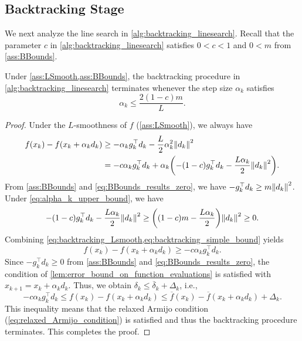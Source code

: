 \documentclass[journal_revised_MPC]{subfiles}
\begin{document}
\subsection{Backtracking Stage}\label{sec:inner_loop}

We next analyze the line search in \cref{alg:backtracking_linesearch}.
Recall that the parameter $c$ in \cref{alg:backtracking_linesearch} satisfies $0 < c < 1$ and $0 < m$ from \cref{ass:BBounds}.

\begin{lemma}\label{lem:backtracking_finite}
    Under \cref{ass:LSmooth,ass:BBounds},
    the backtracking procedure in \cref{alg:backtracking_linesearch} terminates whenever the step size $\alpha_k$ satisfies
    \begin{equation}\label{eq:alpha_k_upper_bound}
        \alpha_k \le \frac{2(1-c)m}{L}.
    \end{equation}
\end{lemma}
\begin{proof}
    Under the $L$-smoothness of $f$ (\cref{ass:LSmooth}), we always have
    \begin{align}
        f(x_k)-f(x_k+\alpha_k d_k)
         & \ge -\alpha_k g_k^\top d_k - \frac{L}{2}\alpha_k^2\norm{d_k}^2                                   \notag                           \\
         & = -c \alpha_k g_k^\top d_k + \alpha_k \qty(-(1-c)g_k^\top d_k - \frac{L\alpha_k}{2}\norm{d_k}^2). \label{eq:backtracking_Lsmooth}
    \end{align}
    From \cref{ass:BBounds} and \cref{eq:BBounds_results_zero}, we have $-g_k^\top d_k \geq m \norm{d_k}^2$.
    Under \cref{eq:alpha_k_upper_bound}, we have
    \begin{equation}\label{eq:backtracking_simple_bound}
        -(1-c)g_k^\top d_k - \frac{L\alpha_k}{2}\norm{d_k}^2
        \ge \qty((1-c)m - \frac{L\alpha_k}{2})\norm{d_k}^2 \ge 0.
    \end{equation}
    Combining \cref{eq:backtracking_Lsmooth,eq:backtracking_simple_bound} yields
    \begin{equation*}
        f(x_k) - f(x_k+\alpha_k d_k) \geq -c \alpha_k g_k^\top d_k.
    \end{equation*}
    Since $-g_k^\top d_k \geq 0$ from \cref{ass:BBounds} and \cref{eq:BBounds_results_zero}, the condition of \cref{lem:error_bound_on_function_evaluations} is satisfied with $x_{k+1} = x_k + \alpha_k d_k$.
    Thus, we obtain $\delta_k \le \overline{\delta}_k + \Delta_k$, i.e.,
    \begin{equation*}
        -c\alpha_k g_k^\top d_k
        \le
        f(x_k) - f(x_k+\alpha_k d_k)
        \le \overline{f}(x_k) - \overline{f}(x_k+\alpha_k d_k) + \Delta_k.
    \end{equation*}
    This inequality means that the relaxed Armijo condition (\cref{eq:relaxed_Armijo_condition}) is satisfied and thus the backtracking procedure terminates.
    This completes the proof.
    \myQED
\end{proof}
\end{document}
